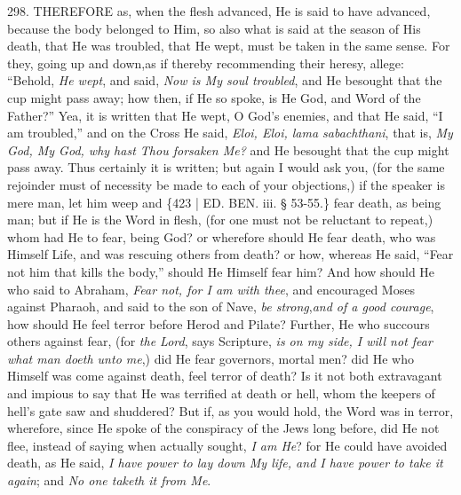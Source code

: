 298.
THEREFORE
as, when the flesh advanced, He is said to have advanced, because the
body belonged to Him, so also what is said at the season of His death,
that He was troubled, that He wept, must be taken in the same sense.
For they, going up and down,\emph{}as if thereby recommending their
heresy, allege: ``Behold, \emph{He wept}, and said, \emph{Now is My soul
troubled}, and He besought that the cup might pass away; how then,
if He so spoke, is He God, and Word of the Father?'' Yea, it is written
that He wept, O God's enemies, and that He said, ``I am troubled,'' and
on the Cross He said, \emph{Eloi, Eloi, lama sabachthani}, that is, \emph{My
God, My God, why hast Thou forsaken Me?} and He besought that the
cup might pass away. Thus certainly it is written; but again I would
ask you, (for the same rejoinder must of necessity be made to each of
your objections,) if the speaker is mere man, let him weep and \{423 |
ED.
BEN.
iii. § 53-55.\} fear
death, as being man; but if He is the Word in flesh, (for one must not
be reluctant to repeat,) whom had He to fear, being God? or wherefore
should He fear death, who was Himself Life, and was rescuing others
from death? or how, whereas He said, ``Fear not him that kills the
body,'' should He Himself fear him? And how should He who said to
Abraham, \emph{Fear not, for I am with thee}, and encouraged Moses
against Pharaoh, and said to the son of Nave, \emph{be strong},\emph{and
of a good courage}, how should He feel terror before Herod and
Pilate? Further, He who succours others against fear, (for \emph{the Lord},
says Scripture, \emph{is on my side, I will not fear what man doeth unto
me},) did He fear governors, mortal men? did He who Himself was
come against death, feel terror of death? Is it not both extravagant
and impious to say that He was terrified at death or hell, whom the
keepers of hell's gate saw and shuddered? But if, as you would hold,
the Word was in terror, wherefore, since He spoke of the conspiracy of
the Jews long before, did He not flee, instead of saying when actually
sought, \emph{I am He}? for He could have avoided death, as He said, \emph{I
have power to lay down My life, and I have power to take it again};
and \emph{No one taketh it from Me}.

